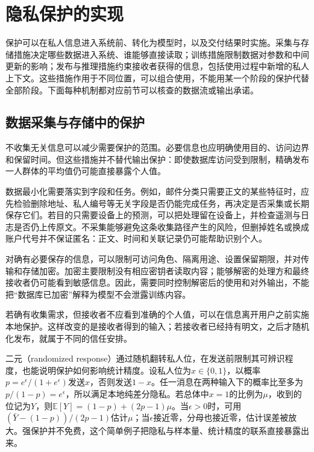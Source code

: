 \section{隐私保护的实现}
\label{sec:privacy-use}

保护可以在私人信息进入系统前、转化为模型时，以及交付结果时实施。采集与存储措施决定哪些数据进入系统、谁能够直接读取；训练措施限制数据对参数和中间更新的影响；发布与推理措施约束接收者获得的信息，包括使用过程中新增的私人上下文。这些措施作用于不同位置，可以组合使用，不能用某一个阶段的保护代替全部阶段。下面每种机制都对应前节可以核查的数据流或输出承诺。

\subsection{数据采集与存储中的保护}
\label{sec:privacy-collection}

不收集无关信息可以减少需要保护的范围。必要信息也应明确使用目的、访问边界和保留时间。但这些措施并不替代输出保护：即使数据库访问受到限制，精确发布一人群体的平均值仍可能直接暴露个人值。

数据最小化需要落实到字段和任务。例如，邮件分类只需要正文的某些特征时，应先检验删除地址、私人编号等无关字段是否仍能完成任务，再决定是否采集或长期保存它们。若目的只需要设备上的预测，可以把处理留在设备上，并检查遥测与日志是否仍上传原文。不采集能够避免这条收集路径产生的风险，但删掉姓名或换成账户代号并不保证匿名：正文、时间和关联记录仍可能帮助识别个人。

对确有必要保存的信息，可以限制可访问角色、隔离用途、设置保留期限，并对传输和存储加密。加密主要限制没有相应密钥者读取内容；能够解密的处理方和最终接收者仍可能看到敏感信息。因此，需要同时控制解密后的使用和对外输出，不能把“数据库已加密”解释为模型不会泄露训练内容。

若确有收集需求，但接收者不应看到准确的个人值，可以在信息离开用户之前实施本地保护。这样改变的是接收者得到的输入；若接收者已经持有明文，之后才随机化发布，就属于不同的信任安排。

二元（randomized response）通过随机翻转私人位，在发送前限制其可辨识程度，也能说明保护如何影响统计精度。设私人位为$x\in\{0,1\}$，以概率$p=e^\epsilon/(1+e^\epsilon)$发送$x$，否则发送$1-x$。任一消息在两种输入下的概率比至多为$p/(1-p)=e^\epsilon$，所以满足本地纯差分隐私。若总体中$x=1$的比例为$\mu$，收到的位记为$Y$，则$\mathbb E[Y]=(1-p)+(2p-1)\mu$。当$\epsilon>0$时，可用$(\bar Y-(1-p))/(2p-1)$估计$\mu$；当$\epsilon$接近零，分母也接近零，估计误差被放大。强保护并不免费，这个简单例子把隐私与样本量、统计精度的联系直接暴露出来。

